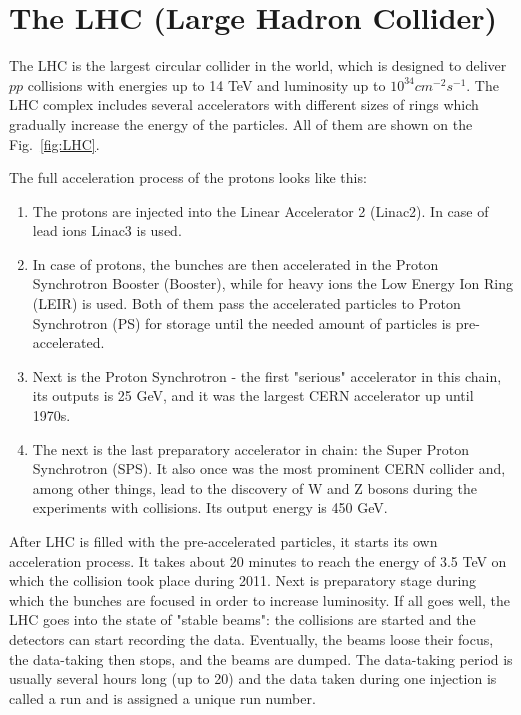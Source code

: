 \chapter{The LHC (Large Hadron Collider)}
\label{sec:LHC}

The LHC is the largest circular collider in the world, which is designed to deliver $pp$ collisions with energies up to 14 TeV and luminosity up to $10^{34} cm^{-2}s^{-1}$. The LHC complex includes several accelerators with different sizes of rings which gradually increase the energy of the particles. All of them are shown on the Fig.~\ref{fig:LHC}.
 
\begin{figure}
\end{figure}

The full acceleration process of the protons looks like this:

\begin{enumerate}
\item The protons are injected into the Linear Accelerator 2 (Linac2). In case of lead ions Linac3 is used.
\item In case of protons, the bunches are then accelerated in the Proton Synchrotron Booster (Booster), while for heavy ions the Low Energy Ion Ring (LEIR) is used. Both of them pass the accelerated particles to Proton Synchrotron (PS) for storage until the needed amount of particles is pre-accelerated.
\item Next is the Proton Synchrotron - the first "serious" accelerator in this chain, its outputs is 25 GeV, and it was the largest CERN accelerator up until 1970s.
\item The next is the last preparatory accelerator in chain: the Super Proton Synchrotron (SPS). It also once was the most prominent CERN collider and, among other things, lead to the discovery of W and Z bosons during the experiments with  collisions. Its output energy is 450 GeV.
\end{enumerate}

After LHC is filled with the pre-accelerated particles, it starts its own acceleration process. It takes about 20 minutes to reach the energy of 3.5 TeV on which the collision took place during 2011. Next is preparatory stage during which the bunches are focused in order to increase luminosity. If all goes well, the LHC goes into the state of "stable beams": the collisions are started and the detectors can start recording the data. Eventually, the beams loose their focus, the data-taking then stops, and the beams are dumped. The data-taking period is usually several hours long (up to 20) and the data taken during one injection is called a run and is assigned a unique run number.


